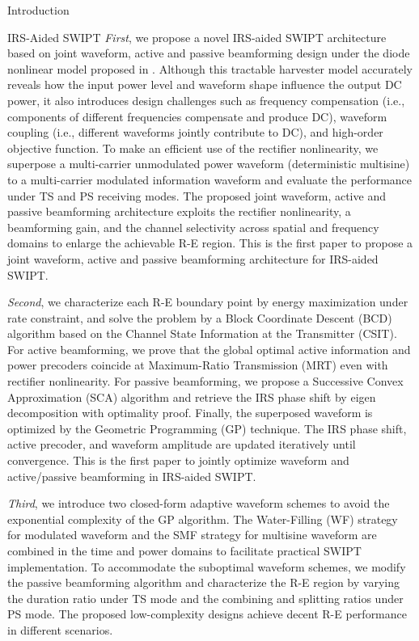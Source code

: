 \documentclass[journal]{IEEEtran}
\begin{document}
\begin{section}{Introduction}
\begin{subsection}{IRS-Aided SWIPT}
			\emph{First}, we propose a novel IRS-aided SWIPT architecture based on joint waveform, active and passive beamforming design under the diode nonlinear model proposed in \cite{Clerckx2016a}. Although this tractable harvester model accurately reveals how the input power level and waveform shape influence the output DC power, it also introduces design challenges such as frequency compensation (i.e., components of different frequencies compensate and produce DC), waveform coupling (i.e., different waveforms jointly contribute to DC), and high-order objective function. To make an efficient use of the rectifier nonlinearity, we superpose a multi-carrier unmodulated power waveform (deterministic multisine) to a multi-carrier modulated information waveform and evaluate the performance under TS and PS receiving modes. The proposed joint waveform, active and passive beamforming architecture exploits the rectifier nonlinearity, a beamforming gain, and the channel selectivity across spatial and frequency domains to enlarge the achievable R-E region. This is the first paper to propose a joint waveform, active and passive beamforming architecture for IRS-aided SWIPT.

			\emph{Second}, we characterize each R-E boundary point by energy maximization under rate constraint, and solve the problem by a Block Coordinate Descent (BCD) algorithm based on the Channel State Information at the Transmitter (CSIT). For active beamforming, we prove that the global optimal active information and power precoders coincide at Maximum-Ratio Transmission (MRT) even with rectifier nonlinearity. For passive beamforming, we propose a Successive Convex Approximation (SCA) algorithm and retrieve the IRS phase shift by eigen decomposition with optimality proof. Finally, the superposed waveform is optimized by the Geometric Programming (GP) technique. The IRS phase shift, active precoder, and waveform amplitude are updated iteratively until convergence. This is the first paper to jointly optimize waveform and active/passive beamforming in IRS-aided SWIPT.

			\emph{Third}, we introduce two closed-form adaptive waveform schemes to avoid the exponential complexity of the GP algorithm. The Water-Filling (WF) strategy for modulated waveform and the SMF strategy for multisine waveform are combined in the time and power domains to facilitate practical SWIPT implementation. To accommodate the suboptimal waveform schemes, we modify the passive beamforming algorithm and characterize the R-E region by varying the duration ratio under TS mode and the combining and splitting ratios under PS mode. The proposed low-complexity designs achieve decent R-E performance in different scenarios.


\end{subsection}
\end{section}
\end{document}
